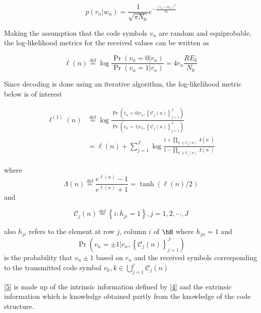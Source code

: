 \documentclass[11pt, oneside, dvipdfmx]{book}
\begin{document}
\begin{equation}
p\left(r_{n} | w_{n}\right)=\frac{1}{\sqrt{\pi N_{0}}} e^{-\frac{\left(r_n-w_{n}\right)^{2}}{N_{0}}}
\label{3}
\end{equation}


Making the assumption that the code symbols $v_n$ are random and equiprobable, the log-likelihood metrics for the received values can be written as

\begin{equation}
\ell(n) \stackrel{\mathrm{def}}{=} \log \frac{\operatorname{Pr}\left(v_{n}=0 | r_{n}\right)}{\operatorname{Pr}\left(v_{n}=1 | r_{n}\right)}=4 r_{n} \frac{R E_{b}}{N_{0}}
\label{4}
\end{equation}

Since decoding is done using an iterative algorithm, the log-likelihood metric below is of interest

\begin{equation}
\begin{aligned} \ell^{(1)}(n) & \stackrel{\mathrm{def}}{=} \log \frac{\operatorname{Pr}\left(v_{n}=0 | r_{n},\left\{\mathcal{C}_{j}(n)\right\}_{j=1}^{J}\right)}{\operatorname{Pr}\left(v_{n}=1 | r_{n},\left\{\mathcal{C}_{j}(n)\right\}_{j=1}^{J}\right)} \\ &=\ell(n)+\sum_{j=1}^{J} \log \frac{1+\prod_{n^{\prime} \in \mathcal{C}_{j}(n)} \Lambda\left(n^{\prime}\right)}{1-\prod_{n^{\prime} \in \mathcal{C}_{j}(n)} \Lambda\left(n^{\prime}\right)} \end{aligned}
\label{5}
\end{equation}

where 
\begin{equation*}
\Lambda(n) \stackrel{\operatorname{def}}{=} \frac{e^{\ell(n)}-1}{e^{\ell(n)}+1}=\tanh (\ell(n) / 2)
\end{equation*} and

$$
\mathcal{C}_{j}(n) \stackrel{\mathrm{def}}{=}\left\{i : \overline{h}_{j i}=1\right\}, j=1,2, \cdots, J
$$

also $\overline{h}_{j i} $ refers to the element at row $j$, column $i$ of $\bH$ where 
$h_{j n}=1$ and $$
\operatorname{Pr}\left(v_{n}=\pm 1 | r_{n},\left\{\mathcal{C}_{j}(n)\right\}_{j=1}^{J}\right)
$$ is the probability that $v_n \pm 1$ based on $r_n$ and the received symbols  corresponding to the transmitted code symbol $v_k,k \in 
\bigcup_{j=1}^{j} \mathcal{C}_{j}(n)$

\ref{5} is made up of the intrinsic information defined by \ref{4} and the extrinsic information which is knowledge obtained partly from the knowledge of the code structure. 
\end{document}
